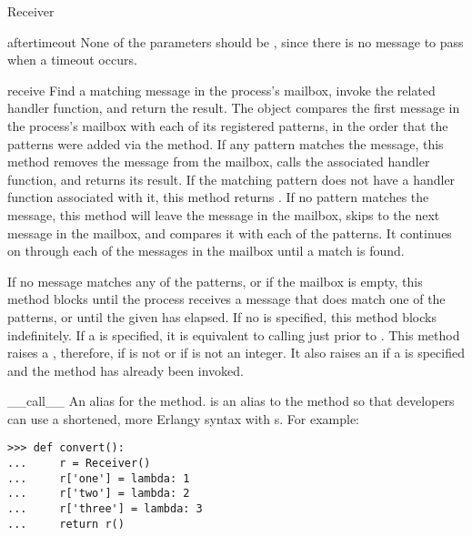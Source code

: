 \documentclass{howto}
\begin{document}
\begin{classdesc}{Receiver}{}
\begin{methoddesc}{after}{timeout}
None of the  parameters should be , since
there is no message to pass when a timeout occurs.
\end{methoddesc}

\begin{methoddesc}{receive}{}
Find a matching message in the process's mailbox, invoke the related handler
function, and return the result. The  object compares the first
message in the process's mailbox with each of its registered patterns, in the
order that the patterns were added via the  method. If any
pattern matches the message, this method removes the message from the mailbox,
calls the associated handler function, and returns its result. If the matching
pattern does not have a handler function associated with it, this method returns
. If no pattern matches the message, this method will leave the
message in the mailbox, skips to the next message in the mailbox, and compares
it with each of the patterns. It continues on through each of the messages in
the mailbox until a match is found.

If no message matches any of the patterns, or if the mailbox is empty, this
method blocks until the process receives a message that does match one of the
patterns, or until the given  has elapsed. If no  is
specified, this method blocks indefinitely. If a  is specified, it
is equivalent to calling 
just prior to . This method raises a 
, therefore, if  is not  or
if  is not an integer. It also raises an 
if a  is specified and the  method has already been
invoked.
\end{methoddesc}

\begin{methoddesc}{__call__}{}
\opindex{()}
An alias for the  method.  is an alias to
the  method so that developers can use a shortened, more
Erlangy syntax with s. For example:
\begin{verbatim}
>>> def convert():
...     r = Receiver()
...     r['one'] = lambda: 1
...     r['two'] = lambda: 2
...     r['three'] = lambda: 3
...     return r()
\end{verbatim}
\end{methoddesc}


\end{classdesc}
\end{document}
